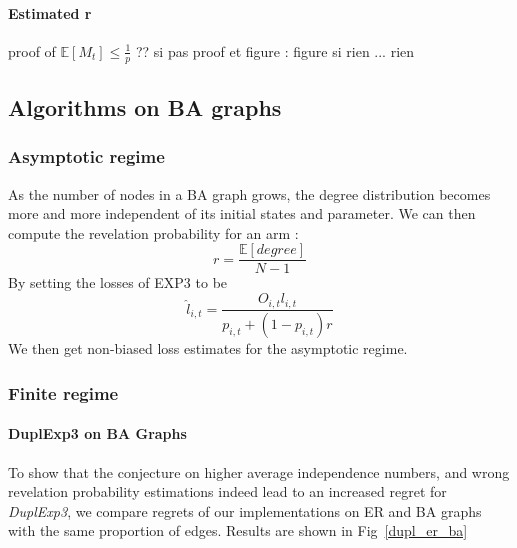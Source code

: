 \documentclass[10pt,a4paper]{scrartcl}
\providecommand{\E}{\mathbb{E}}
\begin{document}
\paragraph{Estimated r}
proof of $\E[M_t] \leq \frac{1}{p}$ ??
si pas proof et figure : figure
si rien ... rien


\subsection{Algorithms on BA graphs}
\subsubsection{Asymptotic regime}
As the number of nodes in a BA graph grows, the degree distribution becomes more and more independent of its initial states and parameter. We can then compute the revelation probability for an arm :
$$r = \frac{\E[degree]}{N-1}$$
By setting the losses of EXP3 to be 
$$\hat{l}_{i,t} = \frac{O_{i,t}l_{i,t}}{p_{i,t}+(1-p_{i,t})r}$$
We then get non-biased loss estimates for the asymptotic regime.


\subsubsection{Finite regime}
\paragraph{DuplExp3 on BA Graphs}
To show that the conjecture on higher average independence numbers, and wrong revelation probability estimations indeed lead to an increased regret for \emph{DuplExp3}, we compare regrets of our implementations on ER and BA graphs with the same proportion of edges. Results are shown in Fig~\ref{dupl_er_ba}
\end{document}
